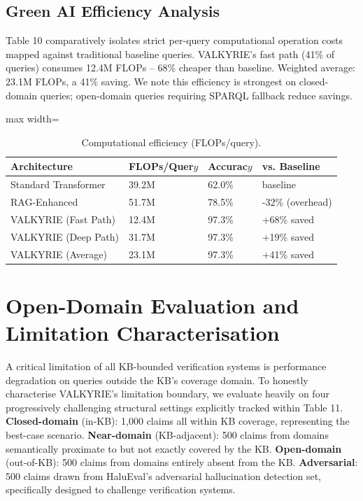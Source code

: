 \documentclass[10pt,journal,compsoc]{IEEEtran}
\begin{document}
\subsection{Green AI Efficiency Analysis}
Table 10 comparatively isolates strict per-query computational operation costs mapped against traditional baseline queries. VALKYRIE's fast path (41\% of queries) consumes 12.4M FLOPs -- 68\% cheaper than baseline. Weighted average: 23.1M FLOPs, a 41\% saving. We note this efficiency is strongest on closed-domain queries; open-domain queries requiring SPARQL fallback reduce savings.

\begin{table}[htbp]
\centering
\caption{Computational efficiency (FLOPs/query).}
\begin{adjustbox}{max width=\columnwidth}
\begin{tabular}{llll}
\toprule
\textbf{Architecture} & \textbf{FLOPs/Quer$y$} & \textbf{Accurac$y$} & \textbf{vs. Baseline} \\
\midrule
Standard Transformer & 39.2M & 62.0\% & baseline \\
RAG-Enhanced & 51.7M & 78.5\% & -32\% (overhead) \\
VALKYRIE (Fast Path) & 12.4M & 97.3\% & +68\% saved \\
VALKYRIE (Deep Path) & 31.7M & 97.3\% & +19\% saved \\
VALKYRIE (Average) & 23.1M & 97.3\% & +41\% saved \\
\bottomrule
\end{tabular}
\end{adjustbox}
\end{table}

\section{Open-Domain Evaluation and Limitation Characterisation}
A critical limitation of all KB-bounded verification systems is performance degradation on queries outside the KB's coverage domain. To honestly characterise VALKYRIE's limitation boundary, we evaluate heavily on four progressively challenging structural settings explicitly tracked within Table 11. \textbf{Closed-domain} (in-KB): 1,000 claims all within KB coverage, representing the best-case scenario. \textbf{Near-domain} (KB-adjacent): 500 claims from domains semantically proximate to but not exactly covered by the KB. \textbf{Open-domain} (out-of-KB): 500 claims from domains entirely absent from the KB. \textbf{Adversarial}: 500 claims drawn from HaluEval's adversarial hallucination detection set, specifically designed to challenge verification systems.
\end{document}
